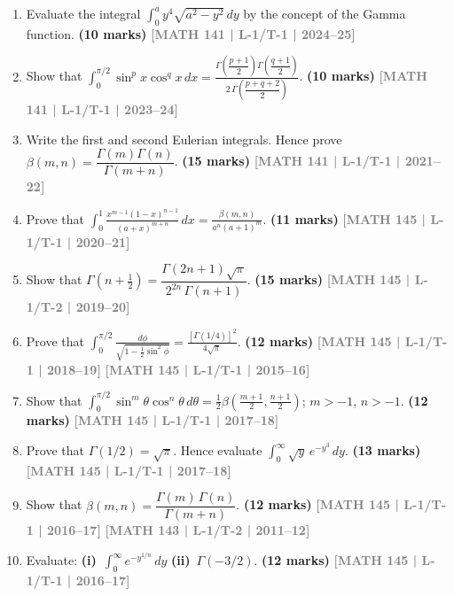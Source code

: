 \documentclass[12pt,a3paper]{article}
\newcommand{\yr}[1]{\hfill\textcolor{gray}{\small\textbf{[#1]}}}
\newcommand{\mk}[1]{\textcolor{orange!70!black}{\small\textbf{(#1 marks)}}}
\begin{document}
\begin{enumerate}
  
\item Evaluate the integral $\displaystyle\int_{0}^{a}y^{4}\sqrt{a^{2}-y^{2}}\,dy$ by the concept of the Gamma function. 
\mk{10}  \yr{MATH 141 | L-1/T-1 | 2024--25}

\item Show that $\displaystyle\int_{0}^{\pi/2}\sin^{p}x\cos^{q}x\,dx=\frac{\Gamma\!\left(\dfrac{p+1}{2}\right)\Gamma\!\left(\dfrac{q+1}{2}\right)}{2\,\Gamma\!\left(\dfrac{p+q+2}{2}\right)}$.
\mk{10} \yr{MATH 141 | L-1/T-1 | 2023--24}

\item Write the first and second Eulerian integrals. Hence prove $\beta(m,n)=\dfrac{\Gamma(m)\Gamma(n)}{\Gamma(m+n)}$.
\mk{15} \yr{MATH 141 | L-1/T-1 | 2021--22}

\item Prove that $\displaystyle\int_{0}^{1}\frac{x^{m-1}(1-x)^{n-1}}{(a+x)^{m+n}}\,dx=\frac{\beta(m,n)}{a^{n}(a+1)^{m}}$.
\mk{11} \yr{MATH 145 | L-1/T-1 | 2020--21}

\item Show that $\Gamma\!\left(n+\tfrac{1}{2}\right)=\dfrac{\Gamma(2n+1)\sqrt{\pi}}{2^{2n}\,\Gamma(n+1)}$.
\mk{15} \yr{MATH 145 | L-1/T-2 | 2019--20}

\item Prove that $\displaystyle\int_{0}^{\pi/2}\frac{d\phi}{\sqrt{1-\tfrac{1}{2}\sin^{2}\phi}}=\frac{[\Gamma(1/4)]^{2}}{4\sqrt{\pi}}$.
\mk{12} \yr{MATH 145 | L-1/T-1 | 2018--19} \yr{MATH 145 | L-1/T-1 | 2015--16}

\item Show that $\displaystyle\int_{0}^{\pi/2}\sin^{m}\theta\cos^{n}\theta\,d\theta=\tfrac{1}{2}\beta\!\left(\tfrac{m+1}{2},\tfrac{n+1}{2}\right)$; $m>-1$, $n>-1$.
\mk{12} \yr{MATH 145 | L-1/T-1 | 2017--18}

\item Prove that $\Gamma(1/2)=\sqrt{\pi}$. Hence evaluate $\displaystyle\int_{0}^{\infty}\sqrt{y}\,e^{-y^{3}}\,dy$.
\mk{13} \yr{MATH 145 | L-1/T-1 | 2017--18}

\item Show that $\beta(m,n)=\dfrac{\Gamma(m)\,\Gamma(n)}{\Gamma(m+n)}$.
\mk{12} \yr{MATH 145 | L-1/T-1 | 2016--17} \yr{MATH 143 | L-1/T-2 | 2011--12}

\item Evaluate: \textbf{(i)}~$\displaystyle\int_{0}^{\infty}e^{-y^{1/n}}\,dy$ \quad \textbf{(ii)}~$\Gamma(-3/2)$.
\mk{12} \yr{MATH 145 | L-1/T-1 | 2016--17}

\end{enumerate}
\end{document}
